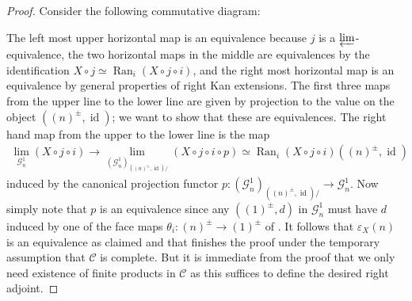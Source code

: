 \documentclass[12pt, reqno]{amsart}
\theoremstyle{plain}
\theoremstyle{definition}
\renewcommand{\epsilon}{\varepsilon}
\begin{document}
\begin{proof}
Consider the following commutative diagram:
\begin{center}
\end{center}
The left most upper horizontal map is an equivalence because $j$ is a $\varprojlim$-equivalence, the two horizontal maps in the middle are equivalences by the identification $X\circ j\simeq \operatorname{Ran}_i(X\circ j \circ i)$, and the right most horizontal map is an equivalence by general properties of right Kan extensions. The first three maps from the upper line to the lower line are given by projection to the value on the object $((n)^\pm,\operatorname{id})$; we want to show that these are equivalences. The right hand map from the upper to the lower line is the map
\begin{align*}
\displaystyle\mathop{\operatorname{lim}}_{\mathcal{G}^1_n} (X\circ j\circ i) \longrightarrow  \displaystyle\mathop{\operatorname{lim}}_{(\mathcal{G}^1_n)_{((n)^\pm,\operatorname{id})/}} (X\circ j\circ i\circ p) \simeq \operatorname{Ran}_i (X\circ j\circ i)((n)^\pm,\operatorname{id})
\end{align*}
induced by the canonical projection functor $p\colon (\mathcal{G}^1_n)_{((n)^\pm,\operatorname{id})/}\longrightarrow \mathcal{G}^1_n$. Now simply note that $p$ is an equivalence since any $((1)^\pm,d)$ in $\mathcal{G}_n^1$ must have $d$ induced by one of the face maps $\theta_i\colon (n)^\pm \rightarrow (1)^\pm$ of . It follows that $\epsilon_X(n)$ is an equivalence as claimed and that finishes the proof under the temporary assumption that $\mathcal{C}$ is complete. But it is immediate from the proof that we only need existence of finite products in $\mathcal{C}$ as this suffices to define the desired right adjoint.
\end{proof}
\end{document}
